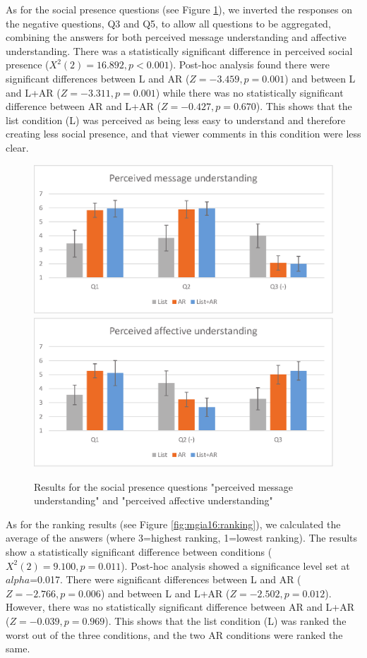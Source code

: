 As for the social presence questions (see Figure \ref{fig:mgia16:social_presence}), we inverted the responses on the negative questions, Q3 and Q5, to allow all questions to be aggregated, combining the answers for both perceived message understanding and affective understanding. There was a statistically significant difference in perceived social presence ($X^2(2)=16.892, p<0.001$). Post-hoc analysis found there were significant differences between L and AR ($Z=-3.459, p=0.001$) and between L and L+AR ($Z=-3.311, p=0.001$) while there was no statistically significant difference between AR and L+AR ($Z=-0.427, p=0.670$). This shows that the list condition (L) was perceived as being less easy to understand and therefore creating less social presence, and that viewer comments in this condition were less clear.

\begin{figure}[ht]
  \centering
  \includegraphics[width=.8\linewidth]{images/mgia16/message.eps}
  \includegraphics[width=.8\linewidth]{images/mgia16/affective.eps}
  \caption{Results for the social presence questions "perceived message understanding" and "perceived affective understanding"}
	\label{fig:mgia16:social_presence}
\end{figure}

As for the ranking results (see Figure \ref{fig:mgia16:ranking}), we calculated the average of the answers (where 3=highest ranking, 1=lowest ranking). The results show a statistically significant difference between conditions ($X^2(2)=9.100, p=0.011$). Post-hoc analysis showed a significance level set at $alpha$=0.017. There were significant differences between L and AR ($Z=-2.766, p=0.006$) and between L and L+AR ($Z=-2.502, p=0.012$). However, there was no statistically significant difference between AR and L+AR ($Z=-0.039, p=0.969$). This shows that the list condition (L) was ranked the worst out of the three conditions, and the two AR conditions were ranked the same.

